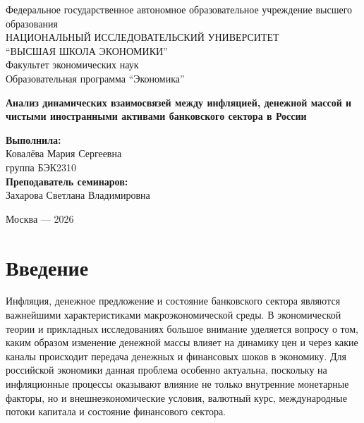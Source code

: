 \documentclass[12pt,a4paper]{article}
\begin{document}
\begin{titlepage}
\thispagestyle{empty}
\setcounter{page}{1}
\begin{center}
{\large Федеральное государственное автономное образовательное учреждение высшего образования}\\[0.4cm]
{\Large НАЦИОНАЛЬНЫЙ ИССЛЕДОВАТЕЛЬСКИЙ УНИВЕРСИТЕТ}\\[0.25cm]
{\Large ``ВЫСШАЯ ШКОЛА ЭКОНОМИКИ''}\\[0.4cm]
{\large Факультет экономических наук}\\[0.2cm]
{\large Образовательная программа ``Экономика''}
\end{center}

\vspace{5.8cm}

\begin{center}
{\LARGE \textbf{Анализ динамических взаимосвязей между инфляцией, денежной массой и чистыми иностранными активами банковского сектора в России}}\\
\end{center}

\vfill

\begin{flushright}
\textbf{Выполнила:}\\[0.5cm]
Ковалёва Мария Сергеевна\\[0.5cm]
группа БЭК2310\\[2cm]

\textbf{Преподаватель семинаров:}\\
Захарова Светлана Владимировна
\end{flushright}

\vspace{1.5cm}

\begin{center}
Москва --- 2026
\end{center}
\end{titlepage}
\setcounter{page}{2}

\tableofcontents
\newpage

\section{Введение}
Инфляция, денежное предложение и состояние банковского сектора являются важнейшими
характеристиками макроэкономической среды. В экономической теории и прикладных
исследованиях большое внимание уделяется вопросу о том, каким образом изменение денежной
массы влияет на динамику цен и через какие каналы происходит передача денежных и финансовых
шоков в экономику. Для российской экономики данная проблема особенно актуальна, поскольку на
инфляционные процессы оказывают влияние не только внутренние монетарные факторы, но и
внешнеэкономические условия, валютный курс, международные потоки капитала и состояние
финансового сектора.
\end{document}
